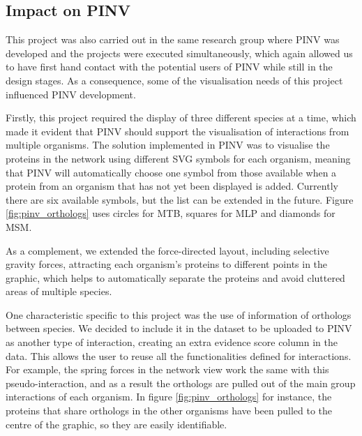 \subsection{Impact on PINV}
This project was also carried out in the same research group where PINV was developed and the projects were executed simultaneously, which again allowed us to have first hand contact with the potential users of PINV while still in the design stages. As a consequence, some of the visualisation needs of this project influenced PINV development.

Firstly, this project required the display of three different species at a time, which made it evident that PINV should support the visualisation of interactions from multiple organisms. The  solution implemented in PINV was to visualise the proteins in the network using different SVG symbols for each organism,  meaning that PINV will automatically choose one symbol from those available when a protein from an organism that has not yet been displayed is added. Currently there are six available symbols, but the list can be extended in the future. Figure \ref{fig:pinv_orthologs} uses circles for MTB, squares for MLP and diamonds for MSM.

As a complement, we extended the force-directed layout, including selective gravity forces, attracting each organism's proteins to different points in the graphic, which helps to automatically separate the proteins and avoid cluttered areas of multiple species.

One characteristic specific to this project was the use of information of orthologs between species. We decided to include it in the dataset to be uploaded to PINV as another type of interaction, creating an extra evidence score column in the data. This allows the user to reuse all the functionalities defined for interactions. For example, the spring forces in the network view work the same with this pseudo-interaction, and as a result the orthologs are pulled out of the main group interactions of each organism. In figure \ref{fig:pinv_orthologs} for instance, the proteins that share orthologs in the other organisms have been pulled to the centre of the graphic, so they are easily identifiable.

